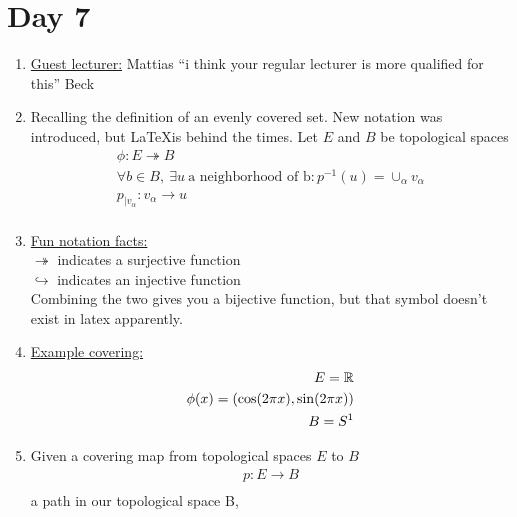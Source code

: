 \section{Day 7}
    \begin{enumerate}
        \item \underline{Guest lecturer:} Mattias ``i think your regular lecturer is more qualified for this'' Beck\\
        \item Recalling the definition of an evenly covered set. New notation was introduced, but
            \LaTeX is behind the times.
            Let $E$ and $B$ be topological spaces
            \begin{align*}
                \phi:E \twoheadrightarrow B\\
                \forall b \in B,\ \exists u\ \text{a neighborhood of b}: p^{-1}(u)=\cup_{\alpha}v_\alpha\\
                p_{|v_{\alpha}}: v_{\alpha}\rightarrow u\\
            \end{align*}
        \item \underline{Fun notation facts:}\\
            $\twoheadrightarrow$ indicates a surjective function\\
            $\hookrightarrow$ indicates an injective function\\
            Combining the two gives you a bijective function, but that symbol doesn't exist
            in latex apparently.
        \item \underline{Example covering:}
            \begin{align*}
                E=\mathbb{R}\\
                \phi(x)=(\cos(2\pi x), \sin(2\pi x))\\
                B=S^{1}\\
            \end{align*}
        \item 
            \begin{definition} Given a covering map from topological
                spaces $E$ to $B$
                \begin{align*}
                    p: E\rightarrow B\\
                \end{align*}
                    a path in our topological space B,
                \begin{align*}

\end{align*}
\end{definition}
\end{enumerate}
